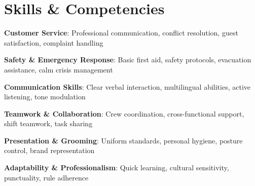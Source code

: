 \documentclass[a4paper,11pt]{article}
\begin{document}
\section{Skills \& Competencies}
\begin{itemize}[leftmargin=0.15in, label={}, itemsep=0pt]
    \small{
    \item \textbf{Customer Service}: Professional communication, conflict resolution, guest satisfaction, complaint handling
    \item \textbf{Safety \& Emergency Response}: Basic first aid, safety protocols, evacuation assistance, calm crisis management
    \item \textbf{Communication Skills}: Clear verbal interaction, multilingual abilities, active listening, tone modulation
    \item \textbf{Teamwork \& Collaboration}: Crew coordination, cross-functional support, shift teamwork, task sharing
    \item \textbf{Presentation \& Grooming}: Uniform standards, personal hygiene, posture control, brand representation
    \item \textbf{Adaptability \& Professionalism}: Quick learning, cultural sensitivity, punctuality, rule adherence
}

\end{itemize}
\end{document}

